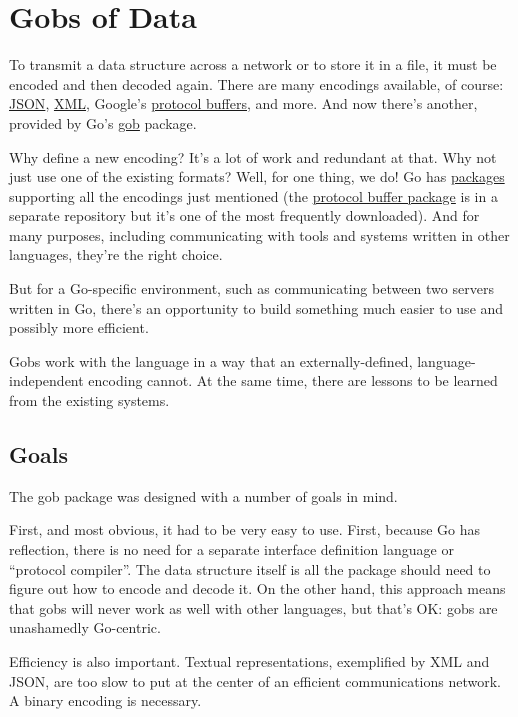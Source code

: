 \cleardoublepage
{}
{}
\chapter*{Gobs of Data}

To transmit a data structure across a network or to store it in a
file, it must be encoded and then decoded again. There are many
encodings available, of course: \href{http://www.json.org/}{JSON},
\href{http://www.w3.org/XML/}{XML}, Google's
\href{http://code.google.com/p/protobuf}{protocol buffers}, and
more.  And now there's another, provided by Go's
\href{http://golang.org/pkg/encoding/gob/}{gob} package.

Why define a new encoding? It's a lot of work and redundant at that.
Why not just use one of the existing formats? Well, for one thing,
we do! Go has \href{http://golang.org/pkg/}{packages} supporting
all the encodings just mentioned (the
\href{http://code.google.com/p/goprotobuf}{protocol buffer package}
is in a separate repository but it's one of the most frequently
downloaded). And for many purposes, including communicating with
tools and systems written in other languages, they're the right
choice.

But for a Go-specific environment, such as communicating between two
servers written in Go, there's an opportunity to build something much
easier to use and possibly more efficient.

Gobs work with the language in a way that an externally-defined,
language-independent encoding cannot. At the same time, there are
lessons to be learned from the existing systems.

\section*{Goals}

The gob package was designed with a number of goals in mind.

First, and most obvious, it had to be very easy to use. First, because
Go has reflection, there is no need for a separate interface definition
language or ``protocol compiler''. The data structure itself is all the
package should need to figure out how to encode and decode it. On the
other hand, this approach means that gobs will never work as well with
other languages, but that's OK: gobs are unashamedly Go-centric.

Efficiency is also important. Textual representations, exemplified by
XML and JSON, are too slow to put at the center of an efficient
communications network. A binary encoding is necessary.

